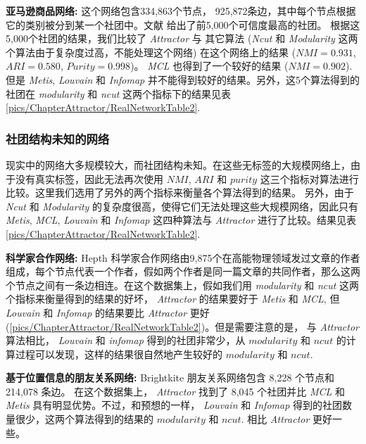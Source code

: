 
\vspace{2mm}
\textbf{亚马逊商品网络:} 这个网络包含334,863个节点， 925,872条边，其中每个节点根据它的类别被分到某一个社团中。文献  给出了前5,000个可信度最高的社团。 根据这5,000个社团的结果，我们比较了 \emph{Attractor} 与 其它算法 (\emph{Ncut} 和 \emph{Modularity} 这两个算法由于复杂度过高，不能处理这个网络) 在这个网络上的结果 ($NMI = 0.931$, $ARI = 0.580$, $Purity = 0.998$)。 \emph{MCL} 也得到了一个较好的结果 ($NMI=0.902$). 但是 \emph{Metis}, \emph{Louvain} 和 \emph{Infomap} 并不能得到较好的结果。另外，这5个算法得到的社团在 \emph{modularity} 和 \emph{ncut} 这两个指标下的结果见表\ref{pics/ChapterAttractor/RealNetworkTable2}.

\subsubsection{社团结构未知的网络}
现实中的网络大多规模较大，而社团结构未知。在这些无标签的大规模网络上，由于没有真实标签，因此无法再次使用 $NMI$, $ARI$ 和 $purity$ 这三个指标对算法进行比较。这里我们选用了另外的两个指标来衡量各个算法得到的结果。 另外，由于 \emph{Ncut} 和 \emph{Modularity} 的复杂度很高，使得它们无法处理这些大规模网络，因此只有 \emph{Metis}, \emph{MCL}, \emph{Louvain} 和 \emph{Infomap} 这四种算法与 \emph{Attractor} 进行了比较。结果见表\ref{pics/ChapterAttractor/RealNetworkTable2}.

\vspace{2mm}
\textbf{科学家合作网络:}  Hepth 科学家合作网络由9,875个在高能物理领域发过文章的作者组成，每个节点代表一个作者，假如两个作者是同一篇文章的共同作者，那么这两个节点之间有一条边相连。在这个数据集上，假如我们用 \emph{modularity} 和 \emph{ncut} 这两个指标来衡量得到的结果的好坏， \emph{Attractor} 的结果要好于 \emph{Metis} 和 \emph{MCL}, 但 \emph{Louvain} 和 \emph{Infomap} 的结果要比 \emph{Attractor} 更好 (\ref{pics/ChapterAttractor/RealNetworkTable2})。但是需要注意的是， 与 \emph{Attractor} 算法相比， \emph{Louvain} 和 \emph{infomap} 得到的社团非常少，从 $modularity$ 和 $ncut$ 的计算过程可以发现，这样的结果很自然地产生较好的 $modularity$ 和 $ncut$. \par
\vspace{2mm}

\textbf{基于位置信息的朋友关系网络:} Brightkite 朋友关系网络包含 8,228 个节点和 214,078 条边。 在这个数据集上， \emph{Attractor} 找到了 8,045 个社团并比 \emph{MCL} 和 \emph{Metis} 具有明显优势。不过，和预想的一样， \emph{Louvain} 和 \emph{Infomap} 得到的社团数量很少，这两个算法得到的结果的 $modularity$ 和 $ncut$. 相比 \emph{Attractor} 更好一些。 \par
\vspace{2mm}

